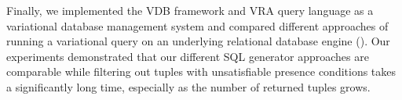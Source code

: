 Finally, we implemented the VDB framework and VRA query language as
a variational database management system and compared different approaches
of running a variational query on an underlying relational database engine 
(). Our experiments demonstrated that our different SQL generator
approaches are comparable while filtering out tuples with unsatisfiable presence
conditions takes a significantly long time, especially as the number of returned
tuples grows. 



